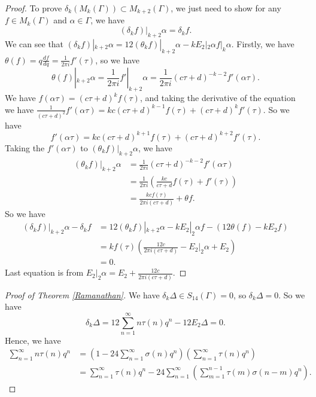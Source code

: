 \documentclass{article}
\begin{document}
\begin{proof}
    To prove $\delta_k(M_k(\Gamma))\subset M_{k+2}(\Gamma)$, we just need to show for any $f\in M_k(\Gamma)$ and $\alpha\in \Gamma$, we have 
    \begin{equation}\label{*}
        (\delta_kf)|_{k+2}\alpha=\delta_kf.
    \end{equation}
    We can see that $(\delta_kf)|_{k+2}\alpha=12(\theta_kf)|_{k+2}\alpha-kE_2|_2\alpha f|_k\alpha$. Firstly, we have $\theta (f)=q\frac{df}{dq}=\frac{1}{2\pi i}f'(\tau)$, so we have 
    \[\theta (f)|_{k+2}\alpha=\frac{1}{2\pi i}f'|_{k+2}\alpha=\frac{1}{2\pi i}(c\tau+d)^{-k-2}f'(\alpha\tau).\]
    We have $f(\alpha\tau)=(c\tau+d)^{k}f(\tau)$, and taking the derivative of the equation we have $\frac{1}{(c\tau+d)^2}f'(\alpha\tau)=kc(c\tau+d)^{k-1}f(\tau)+(c\tau+d)^kf'(\tau)$. So we have 
    \[f'(\alpha\tau)=kc(c\tau+d)^{k+1}f(\tau)+(c\tau+d)^{k+2}f'(\tau).\]
    Taking the $f'(\alpha\tau)$ to $(\theta_kf)|_{k+2}\alpha$, we have 
    \begin{equation*}
        \begin{aligned}
            (\theta_kf)|_{k+2}\alpha&=\frac{1}{2\pi i}(c\tau+d)^{-k-2}f'(\alpha\tau)\\
            &=\frac{1}{2\pi i}\left(\frac{kc}{c\tau+d}f(\tau)+f'(\tau)\right)\\
            &=\frac{kcf(\tau)}{2\pi i(c\tau+d)}+\theta f.
        \end{aligned}
    \end{equation*}
    So we have 
    \begin{equation*}
        \begin{aligned}
            (\delta_kf)|_{k+2}\alpha-\delta_kf&=12(\theta_kf)|_{k+2}\alpha-kE_2|_2\alpha f-\left(12\theta (f)-kE_2f\right)\\
            &=kf(\tau)\left(\frac{12c}{2\pi i(c\tau+d)}-E_2|_2\alpha+E_2\right)\\
            &=0.
        \end{aligned}
    \end{equation*}
    Last equation is from $E_2|_2\alpha=E_2+\frac{12c}{2\pi i(c\tau+d)}$.
\end{proof}
\begin{proof}[Proof of Theorem \ref{Ramanathan}]
    We have $\delta_k\Delta\in S_{14}(\Gamma)=0$, so $\delta_k\Delta=0$. So we have 
    \[\delta_k\Delta=12\sum_{n=1}^{\infty}n\tau(n)q^n-12E_2\Delta=0.\]
    Hence, we have
    \begin{equation*}
        \begin{aligned}
            \sum_{n=1}^{\infty}n\tau(n)q^n&=\left(1-24\sum_{n=1}^{\infty}\sigma(n)q^n\right)\left(\sum_{n=1}^{\infty}\tau(n)q^n\right)\\
            &=\sum_{n=1}^{\infty}\tau(n)q^n-24\sum_{n=1}^{\infty}\left(\sum_{m=1}^{n-1}\tau(m)\sigma(n-m)q^n\right).
        \end{aligned}
    \end{equation*}
\end{proof}

% 

\end{document}
